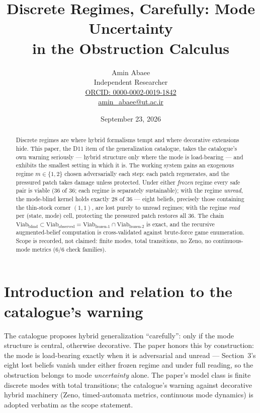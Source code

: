 \documentclass[10pt,twocolumn]{article}
\theoremstyle{definition}
\begin{document}
\title{Discrete Regimes, Carefully: Mode Uncertainty\\ in the Obstruction Calculus}
\author{Amin Abaee\\[0.35em]
{\small Independent Researcher}\\[0.55em]
{\small\href{https://orcid.org/0000-0002-0019-1842}{ORCID: 0000-0002-0019-1842}}\\[0.3em]
{\small\href{mailto:amin\_abaee@ut.ac.ir}{amin\_abaee@ut.ac.ir}}}
\date{September 23, 2026}
\maketitle

\begin{abstract}
Discrete regimes are where hybrid formalisms tempt and where decorative
extensions hide. This paper, the D11 item of the generalization catalogue,
takes the catalogue's own warning seriously --- hybrid structure only where
the mode is load-bearing --- and exhibits the smallest setting in which it
is. The working system gains an exogenous regime $m\in\{1,2\}$ chosen
adversarially each step: each patch regenerates, and the pressured patch
takes damage unless protected. Under either \emph{frozen} regime every
safe pair is viable ($36$ of $36$; each regime is separately
sustainable); with the regime \emph{unread}, the mode-blind kernel holds
exactly $28$ of $36$ --- eight beliefs, precisely those containing the
thin-stock corner $(1,1)$, are lost purely to unread regimes; with the
regime \emph{read} per (state, mode) cell, protecting the pressured patch
restores all $36$. The chain
$\mathrm{Viab}_{\text{blind}}\subset\mathrm{Viab}_{\text{observed}}=
\mathrm{Viab}_{\text{frozen-}1}\cap\mathrm{Viab}_{\text{frozen-}2}$ is
exact, and the recursive augmented-belief computation is cross-validated
against brute-force game enumeration. Scope is recorded, not claimed:
finite modes, total transitions, no Zeno, no continuous-mode metrics
(6/6 check families).
\end{abstract}

\section{Introduction and relation to the catalogue's warning}

The catalogue proposes hybrid generalization ``carefully'': only if the
mode structure is central, otherwise decorative. The paper honors this by
construction: the mode is load-bearing exactly when it is adversarial and
unread --- Section~3's eight lost beliefs vanish under either frozen
regime and under full reading, so the obstruction belongs to mode
\emph{uncertainty} alone. The paper's model class is finite discrete modes
with total transitions; the catalogue's warning against decorative hybrid
machinery (Zeno, timed-automata metrics, continuous mode dynamics) is
adopted verbatim as the scope statement.
\end{document}
